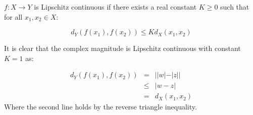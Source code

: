 $f: X \rightarrow Y$ is Lipschitz continuous if there exists a real constant $K \geq 0$
such that for all $x_1, x_2 \in X$:

$$ d_{Y} (f(x_{1}),f(x_{2})) \leq K d_{X}(x_{1}, x_{2}) $$

It is clear that the complex magnitude is Lipschitz continuous with constant
$K=1$ as:

\begin{eqnarray*}
  d_{Y} (f(x_{1}),f(x_{2})) &=& ||w| - |z|| \\
                            & \leq & |w - z| \\
                            & = & d_X(x_1, x_2)
\end{eqnarray*}
Where the second line holds by the reverse triangle inequality.
